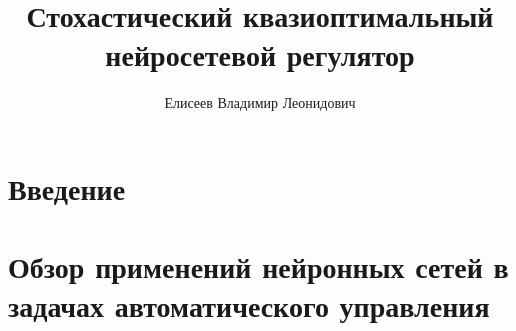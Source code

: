 \documentclass[12pt]{rusthesis}
\title{Стохастический квазиоптимальный нейросетевой регулятор}
\author{Елисеев Владимир Леонидович}
\begin{document}

\setcounter{tocdepth}{3}\tableofcontents

\chapter*{Введение}

%

\chapter{Обзор применений нейронных сетей в задачах автоматического управления}



\end{document}
